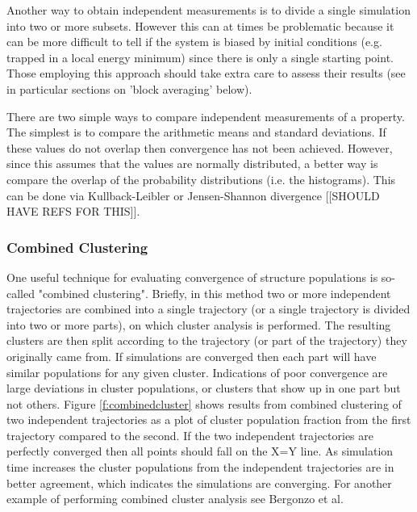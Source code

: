 Another way to obtain independent measurements is to divide a single simulation into two or more subsets. However this can at times be problematic because it can be more difficult to tell if the system is biased by initial conditions (e.g. trapped in a local energy minimum) since there is only a single starting point. Those employing this approach should take extra care to assess their results (see in particular sections on 'block averaging' below).

There are two simple ways to compare independent measurements of a property. The simplest is to compare the arithmetic means and standard deviations. If these values do not overlap then convergence has not been achieved. However, since this assumes that the values are normally distributed, a better way is compare the overlap of the probability distributions (i.e. the histograms). This can be done via Kullback-Leibler or Jensen-Shannon divergence {\color{red}[[SHOULD HAVE REFS FOR THIS]]}.

\subsubsection*{Combined Clustering}
One useful technique for evaluating convergence of structure populations is so-called "combined clustering". Briefly, in this method two or more independent trajectories are combined into a single trajectory (or a single trajectory is divided into two or more parts), on which cluster analysis is performed. The resulting clusters are then split according to the trajectory (or part of the trajectory) they originally came from. If simulations are converged then each part will have similar populations for any given cluster. Indications of poor convergence are large deviations in cluster populations, or clusters that show up in one part but not others. Figure \ref{f:combinedcluster} shows results from combined clustering of two independent trajectories as a plot of cluster population fraction from the first trajectory compared to the second. If the two independent trajectories are perfectly converged then all points should fall on the X=Y line. As simulation time increases the cluster populations from the independent trajectories are in better agreement, which indicates the simulations are converging. For another example of performing combined cluster analysis see Bergonzo et al.\citep{Bergonzo2014}
